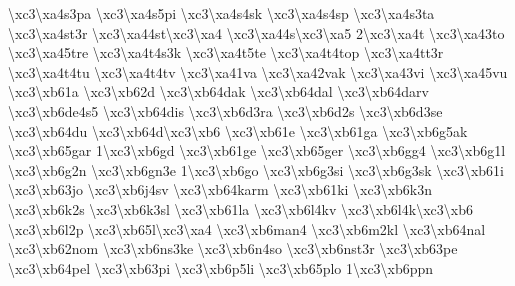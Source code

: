 \begin{DoxyCompactItemize}
\textbackslash{}xc3\textbackslash{}xa4s3pa \textbackslash{}xc3\textbackslash{}xa4s5pi \textbackslash{}xc3\textbackslash{}xa4s4sk \textbackslash{}xc3\textbackslash{}xa4s4sp \textbackslash{}xc3\textbackslash{}xa4s3ta \textbackslash{}xc3\textbackslash{}xa4st3r \textbackslash{}xc3\textbackslash{}xa44st\textbackslash{}xc3\textbackslash{}xa4 \textbackslash{}xc3\textbackslash{}xa44s\textbackslash{}xc3\textbackslash{}xa5 2\textbackslash{}xc3\textbackslash{}xa4t \textbackslash{}xc3\textbackslash{}xa43to \textbackslash{}xc3\textbackslash{}xa45tre \textbackslash{}xc3\textbackslash{}xa4t4s3k \textbackslash{}xc3\textbackslash{}xa4t5te \textbackslash{}xc3\textbackslash{}xa4t4top \textbackslash{}xc3\textbackslash{}xa4tt3r \textbackslash{}xc3\textbackslash{}xa4t4tu \textbackslash{}xc3\textbackslash{}xa4t4tv \textbackslash{}xc3\textbackslash{}xa41va \textbackslash{}xc3\textbackslash{}xa42vak \textbackslash{}xc3\textbackslash{}xa43vi \textbackslash{}xc3\textbackslash{}xa45vu \textbackslash{}xc3\textbackslash{}xb61a \textbackslash{}xc3\textbackslash{}xb62d \textbackslash{}xc3\textbackslash{}xb64dak \textbackslash{}xc3\textbackslash{}xb64dal \textbackslash{}xc3\textbackslash{}xb64darv \textbackslash{}xc3\textbackslash{}xb6de4s5 \textbackslash{}xc3\textbackslash{}xb64dis \textbackslash{}xc3\textbackslash{}xb6d3ra \textbackslash{}xc3\textbackslash{}xb6d2s \textbackslash{}xc3\textbackslash{}xb6d3se \textbackslash{}xc3\textbackslash{}xb64du \textbackslash{}xc3\textbackslash{}xb64d\textbackslash{}xc3\textbackslash{}xb6 \textbackslash{}xc3\textbackslash{}xb61e \textbackslash{}xc3\textbackslash{}xb61ga \textbackslash{}xc3\textbackslash{}xb6g5ak \textbackslash{}xc3\textbackslash{}xb65gar 1\textbackslash{}xc3\textbackslash{}xb6gd \textbackslash{}xc3\textbackslash{}xb61ge \textbackslash{}xc3\textbackslash{}xb65ger \textbackslash{}xc3\textbackslash{}xb6gg4 \textbackslash{}xc3\textbackslash{}xb6g1l \textbackslash{}xc3\textbackslash{}xb6g2n \textbackslash{}xc3\textbackslash{}xb6gn3e 1\textbackslash{}xc3\textbackslash{}xb6go \textbackslash{}xc3\textbackslash{}xb6g3si \textbackslash{}xc3\textbackslash{}xb6g3sk \textbackslash{}xc3\textbackslash{}xb61i \textbackslash{}xc3\textbackslash{}xb63jo \textbackslash{}xc3\textbackslash{}xb6j4sv \textbackslash{}xc3\textbackslash{}xb64karm \textbackslash{}xc3\textbackslash{}xb61ki \textbackslash{}xc3\textbackslash{}xb6k3n \textbackslash{}xc3\textbackslash{}xb6k2s \textbackslash{}xc3\textbackslash{}xb6k3sl \textbackslash{}xc3\textbackslash{}xb61la \textbackslash{}xc3\textbackslash{}xb6l4kv \textbackslash{}xc3\textbackslash{}xb6l4k\textbackslash{}xc3\textbackslash{}xb6 \textbackslash{}xc3\textbackslash{}xb6l2p \textbackslash{}xc3\textbackslash{}xb65l\textbackslash{}xc3\textbackslash{}xa4 \textbackslash{}xc3\textbackslash{}xb6man4 \textbackslash{}xc3\textbackslash{}xb6m2kl \textbackslash{}xc3\textbackslash{}xb64nal \textbackslash{}xc3\textbackslash{}xb62nom \textbackslash{}xc3\textbackslash{}xb6ns3ke \textbackslash{}xc3\textbackslash{}xb6n4so \textbackslash{}xc3\textbackslash{}xb6nst3r \textbackslash{}xc3\textbackslash{}xb63pe \textbackslash{}xc3\textbackslash{}xb64pel \textbackslash{}xc3\textbackslash{}xb63pi \textbackslash{}xc3\textbackslash{}xb6p5li \textbackslash{}xc3\textbackslash{}xb65plo 1\textbackslash{}xc3\textbackslash{}xb6ppn 
\end{DoxyCompactItemize}
